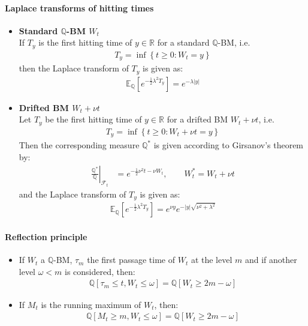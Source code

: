 \documentclass[a4paper,landscape,8pt,fleqn]{scrartcl}
\renewcommand{\emph}[1]{\textbf{#1}}
\begin{document}
\begin{multicols*}{4}
\paragraph{Laplace transforms of hitting times}
\begin{itemize}
\item \emph{Standard $\mathbb{Q}$-BM $W_t$} \\
If $T_y$ is the first hitting time of $y \in \mathbb{R}$ for a standard $\mathbb{Q}$-BM, i.e.
\begin{align*}
T_y = \inf \left \lbrace t \geq 0 : W_t = y \right \rbrace
\end{align*}
then the Laplace transform of $T_y$ is given as:
\begin{align*}
\mathbb{E}_\mathbb{Q} \left[ e^{-\frac{1}{2} \lambda^2 T_y} \right] = e^{-\lambda |y|}
\end{align*}
\item \emph{Drifted BM $W_t + \nu t$} \\
Let $T_y$ be the first hitting time of $y \in \mathbb{R}$ for a drifted BM $W_t + \nu t$, i.e.
\begin{align*}
T_y = \inf \left \lbrace t \geq 0 : W_t + \nu t = y \right \rbrace
\end{align*}
Then the corresponding measure $\mathbb{Q}^\ast$ is given according to Girsanov's theorem by:
\begin{align*}
\left. \frac{\mathbb{Q}^\ast}{\mathbb{Q}} \right|_{\mathcal{F}_t} &= e^{-\frac{1}{2} \nu^2 t - \nu W_t}, \qquad W_t^\ast = W_t + \nu t
\end{align*}
and the Laplace transform of $T_y$ is given as:
\begin{align*}
\mathbb{E}_\mathbb{Q} \left[ e^{-\frac{1}{2} \lambda^2 T_y} \right] = e^{\nu y} e^{-|y| \sqrt{\nu^2 + \lambda^2}}
\end{align*}
\end{itemize}

\paragraph{Reflection principle}
\begin{itemize}
\item If $W_t$ a $\mathbb{Q}$-BM, $\tau_m$ the first passage time of $W_t$ at the level $m$ and if another level $\omega < m$ is considered, then:
\begin{align*}
\mathbb{Q} \left[ \tau_m \leq t, W_t \leq \omega \right] = \mathbb{Q} \left[ W_t \geq 2m - \omega \right]
\end{align*}
\item If $M_t$ is the running maximum of $W_t$, then:
\begin{align*}
\mathbb{Q} \left[ M_t \geq m, W_t \leq \omega \right] = \mathbb{Q} \left[ W_t \geq 2m - \omega \right]
\end{align*}
\end{itemize}


\end{multicols*}
\end{document}
